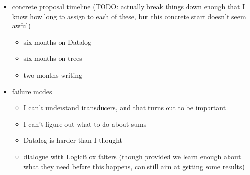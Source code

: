 \documentclass{article}
\begin{document}
\begin{itemize}
    \item concrete proposal timeline (TODO: actually break things down
        enough that I know how long to assign to each of these, but this
        concrete start doesn't seem awful)
        \begin{itemize}
            \item six months on Datalog
            \item six months on trees
            \item two months writing
        \end{itemize}
    \item failure modes
        \begin{itemize}
            \item I can't understand transducers, and that turns out to be
                important
            \item I can't figure out what to do about sums
            \item Datalog is harder than I thought
            \item dialogue with LogicBlox falters (though provided we learn enough
                about what they need before this happens, can still aim at
                getting some results)
        \end{itemize}
\end{itemize}
\end{document}

